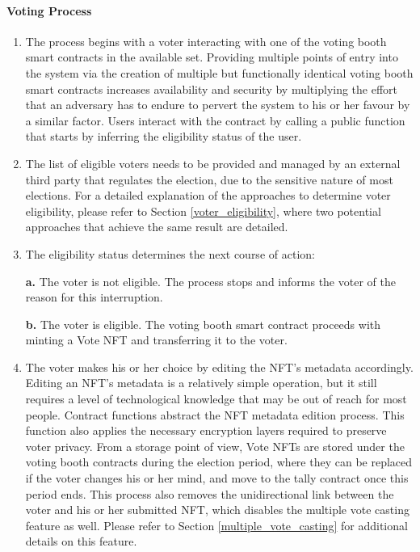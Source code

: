 \documentclass[../main.tex]{subfiles}
\begin{document}
\paragraph{Voting Process}
\begin{enumerate}
    \item{The process begins with a voter interacting with one of the voting booth smart contracts in the available set. Providing multiple points of entry into the system via the creation of multiple but functionally identical voting booth smart contracts increases availability and security by multiplying the effort that an adversary has to endure to pervert the system to his or her favour by a similar factor. Users interact with the contract by calling a public function that starts by inferring the eligibility status of the user.}

    \item{The list of eligible voters needs to be provided and managed by an external third party that regulates the election, due to the sensitive nature of most elections. For a detailed explanation of the approaches to determine voter eligibility, please refer to Section \ref{voter_eligibility}, where two potential approaches that achieve the same result are detailed.}

    \item{The eligibility status determines the next course of action:
          \par
          \textbf{a.} The voter is not eligible. The process stops and informs the voter of the reason for this interruption.
          \par
          \textbf{b.} The voter is eligible. The voting booth smart contract proceeds with minting a Vote NFT and transferring it to the voter.}

    \item{The voter makes his or her choice by editing the NFT's metadata accordingly. Editing an NFT's metadata is a relatively simple operation, but it still requires a level of technological knowledge that may be out of reach for most people. Contract functions abstract the NFT metadata edition process. This function also applies the necessary encryption layers required to preserve voter privacy. From a storage point of view, Vote NFTs are stored under the voting booth contracts during the election period, where they can be replaced if the voter changes his or her mind, and move to the tally contract once this period ends. This process also removes the unidirectional link between the voter and his or her submitted NFT, which disables the multiple vote casting feature as well. Please refer to Section \ref{multiple_vote_casting} for additional details on this feature.}


\end{enumerate}
\end{document}
